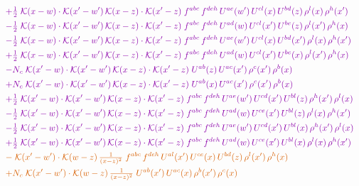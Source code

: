 \documentclass[10pt]{article}
\numberwithin{equation}{section}
\begin{document}
\begin{align}
&\quad{\color{CC}+\tfrac{1}{2}\;\mathcal{K}(x-w)\cdot\mathcal{K}(x'-w')\,\mathcal{K}(x-z)\cdot\mathcal{K}(x'-z)\;f^{abc}\,f^{deh}\,U^{ae}(w')\,U^{cl}(x)\,U^{bd}(z)\,\rho^{l}(x)\,\rho^{h}(x')}\notag\\
&\quad{\color{CC}-\tfrac{1}{2}\;\mathcal{K}(x-w)\cdot\mathcal{K}(x'-w')\,\mathcal{K}(x-z)\cdot\mathcal{K}(x'-z)\;f^{abc}\,f^{deh}\,U^{ad}(w)\,U^{cl}(x')\,U^{be}(z)\,\rho^{l}(x')\,\rho^{h}(x)}\notag\\
&\quad{\color{CC}-\tfrac{1}{2}\;\mathcal{K}(x-w)\cdot\mathcal{K}(x'-w')\,\mathcal{K}(x-z)\cdot\mathcal{K}(x'-z)\;f^{abc}\,f^{deh}\,U^{ae}(w')\,U^{cl}(x)\,U^{bd}(x')\,\rho^{l}(x)\,\rho^{h}(x')}\notag\\
&\quad{\color{CC}+\tfrac{1}{2}\;\mathcal{K}(x-w)\cdot\mathcal{K}(x'-w')\,\mathcal{K}(x-z)\cdot\mathcal{K}(x'-z)\;f^{abc}\,f^{deh}\,U^{ad}(w)\,U^{cl}(x')\,U^{be}(x)\,\rho^{l}(x')\,\rho^{h}(x)}\notag\\
&\quad{\color{CC}-N_c\;\mathcal{K}(x'-w)\cdot\mathcal{K}(x'-w')\,\mathcal{K}(x-z)\cdot\mathcal{K}(x'-z)\;U^{ab}(z)\,U^{ac}(x')\,\rho^{c}(x')\,\rho^{b}(x)}\notag\\
&\quad{\color{CC}+N_c\;\mathcal{K}(x'-w)\cdot\mathcal{K}(x'-w')\,\mathcal{K}(x-z)\cdot\mathcal{K}(x'-z)\;U^{ab}(x)\,U^{ac}(x')\,\rho^{c}(x')\,\rho^{b}(x)}\notag\\
&\quad{\color{CC}+\tfrac{1}{2}\;\mathcal{K}(x'-w)\cdot\mathcal{K}(x'-w')\,\mathcal{K}(x-z)\cdot\mathcal{K}(x'-z)\;f^{abc}\,f^{deh}\,U^{ae}(w')\,U^{cd}(x')\,U^{bl}(z)\,\rho^{h}(x')\,\rho^{l}(x)}\notag\\
&\quad{\color{CC}-\tfrac{1}{2}\;\mathcal{K}(x'-w)\cdot\mathcal{K}(x'-w')\,\mathcal{K}(x-z)\cdot\mathcal{K}(x'-z)\;f^{abc}\,f^{deh}\,U^{ad}(w)\,U^{ce}(x')\,U^{bl}(z)\,\rho^{l}(x)\,\rho^{h}(x')}\notag\\
&\quad{\color{CC}-\tfrac{1}{2}\;\mathcal{K}(x'-w)\cdot\mathcal{K}(x'-w')\,\mathcal{K}(x-z)\cdot\mathcal{K}(x'-z)\;f^{abc}\,f^{deh}\,U^{ae}(w')\,U^{cd}(x')\,U^{bl}(x)\,\rho^{h}(x')\,\rho^{l}(x)}\notag\\
&\quad{\color{CC}+\tfrac{1}{2}\;\mathcal{K}(x'-w)\cdot\mathcal{K}(x'-w')\,\mathcal{K}(x-z)\cdot\mathcal{K}(x'-z)\;f^{abc}\,f^{deh}\,U^{ad}(w)\,U^{ce}(x')\,U^{bl}(x)\,\rho^{l}(x)\,\rho^{h}(x')}\notag\\
&\quad{\color{BFK}-\;\mathcal{K}(x'-w')\cdot\mathcal{K}(w-z)\,\tfrac{1}{(x-z)^{2}}\;f^{abc}\,f^{deh}\,U^{al}(x')\,U^{ce}(x)\,U^{bd}(z)\,\rho^{l}(x')\,\rho^{h}(x)}\notag\\
&\quad{\color{BFK}+N_c\;\mathcal{K}(x'-w')\cdot\mathcal{K}(w-z)\,\tfrac{1}{(x-z)^{2}}\;U^{ab}(x')\,U^{ac}(x)\,\rho^{b}(x')\,\rho^{c}(x)}\notag\\

\end{align}
\end{document}
